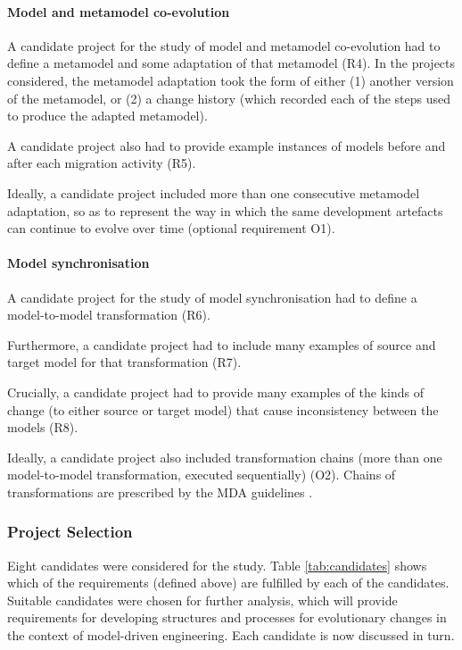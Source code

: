 \paragraph{Model and metamodel co-evolution}
A candidate project for the study of model and metamodel co-evolution had to define a metamodel and some adaptation of that metamodel (R4). In the projects considered, the metamodel adaptation took the form of either (1) another version of the metamodel, or (2) a change history (which recorded each of the steps used to produce the adapted metamodel).

A candidate project also had to provide example instances of models before and after each migration activity (R5).

Ideally, a candidate project included more than one consecutive metamodel adaptation, so as to represent the way in which the same development artefacts can continue to evolve over time (optional requirement O1).

\paragraph{Model synchronisation}
A candidate project for the study of model synchronisation had to define a model-to-model transformation (R6).

Furthermore, a candidate project had to include many examples of source and target model for that transformation (R7).

Crucially, a candidate project had to provide many examples of the kinds of change (to either source or target model) that cause inconsistency between the models (R8). 

Ideally, a candidate project also included transformation chains (more than one model-to-model transformation, executed sequentially) (O2). Chains of transformations are prescribed by the MDA guidelines \cite{kleppe03mda}.


\subsubsection{Project Selection} %
\label{ssub:project_selection}
Eight candidates were considered for the study. Table \ref{tab:candidates} shows which of the requirements (defined above) are fulfilled by each of the candidates. Suitable candidates were chosen for further analysis, which will provide requirements for developing structures and processes for evolutionary changes in the context of model-driven engineering. Each candidate is now discussed in turn.

